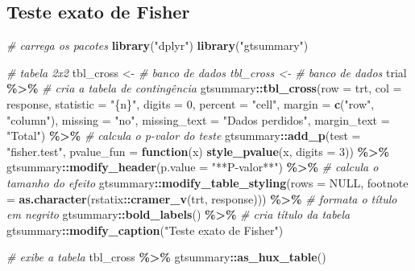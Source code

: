 \documentclass[
]{book}
\newenvironment{Shaded}{\begin{snugshade}}{\end{snugshade}}
\newcommand{\AttributeTok}[1]{\textcolor[rgb]{0.13,0.29,0.53}{#1}}
\newcommand{\CommentTok}[1]{\textcolor[rgb]{0.56,0.35,0.01}{\textit{#1}}}
\newcommand{\ConstantTok}[1]{\textcolor[rgb]{0.56,0.35,0.01}{#1}}
\newcommand{\ControlFlowTok}[1]{\textcolor[rgb]{0.13,0.29,0.53}{\textbf{#1}}}
\newcommand{\DecValTok}[1]{\textcolor[rgb]{0.00,0.00,0.81}{#1}}
\newcommand{\FunctionTok}[1]{\textcolor[rgb]{0.13,0.29,0.53}{\textbf{#1}}}
\newcommand{\NormalTok}[1]{#1}
\newcommand{\OtherTok}[1]{\textcolor[rgb]{0.56,0.35,0.01}{#1}}
\newcommand{\SpecialCharTok}[1]{\textcolor[rgb]{0.81,0.36,0.00}{\textbf{#1}}}
\newcommand{\StringTok}[1]{\textcolor[rgb]{0.31,0.60,0.02}{#1}}
\begin{document}
\hypertarget{teste-exato-de-fisher}{%
\subsection{Teste exato de Fisher}\label{teste-exato-de-fisher}}

\begin{Shaded}
\begin{Highlighting}[]
\CommentTok{\# carrega os pacotes}
\FunctionTok{library}\NormalTok{(}\StringTok{"dplyr"}\NormalTok{)}
\FunctionTok{library}\NormalTok{(}\StringTok{"gtsummary"}\NormalTok{)}

\CommentTok{\# tabela 2x2}
\NormalTok{tbl\_cross }\OtherTok{\textless{}{-}} \CommentTok{\# banco de dados tbl\_cross \textless{}{-} \# banco de dados}
\NormalTok{trial }\SpecialCharTok{\%\textgreater{}\%}
    \CommentTok{\# cria a tabela de contingência}
\NormalTok{gtsummary}\SpecialCharTok{::}\FunctionTok{tbl\_cross}\NormalTok{(}\AttributeTok{row =}\NormalTok{ trt, }\AttributeTok{col =}\NormalTok{ response, }\AttributeTok{statistic =} \StringTok{"\{n\}"}\NormalTok{, }\AttributeTok{digits =} \DecValTok{0}\NormalTok{, }\AttributeTok{percent =} \StringTok{"cell"}\NormalTok{,}
    \AttributeTok{margin =} \FunctionTok{c}\NormalTok{(}\StringTok{"row"}\NormalTok{, }\StringTok{"column"}\NormalTok{), }\AttributeTok{missing =} \StringTok{"no"}\NormalTok{, }\AttributeTok{missing\_text =} \StringTok{"Dados perdidos"}\NormalTok{,}
    \AttributeTok{margin\_text =} \StringTok{"Total"}\NormalTok{) }\SpecialCharTok{\%\textgreater{}\%}
    \CommentTok{\# calcula o p{-}valor do teste}
\NormalTok{gtsummary}\SpecialCharTok{::}\FunctionTok{add\_p}\NormalTok{(}\AttributeTok{test =} \StringTok{"fisher.test"}\NormalTok{, }\AttributeTok{pvalue\_fun =} \ControlFlowTok{function}\NormalTok{(x) }\FunctionTok{style\_pvalue}\NormalTok{(x, }\AttributeTok{digits =} \DecValTok{3}\NormalTok{)) }\SpecialCharTok{\%\textgreater{}\%}
\NormalTok{    gtsummary}\SpecialCharTok{::}\FunctionTok{modify\_header}\NormalTok{(}\AttributeTok{p.value =} \StringTok{"**P{-}valor**"}\NormalTok{) }\SpecialCharTok{\%\textgreater{}\%}
    \CommentTok{\# calcula o tamanho do efeito}
\NormalTok{gtsummary}\SpecialCharTok{::}\FunctionTok{modify\_table\_styling}\NormalTok{(}\AttributeTok{rows =} \ConstantTok{NULL}\NormalTok{, }\AttributeTok{footnote =} \FunctionTok{as.character}\NormalTok{(rstatix}\SpecialCharTok{::}\FunctionTok{cramer\_v}\NormalTok{(trt,}
\NormalTok{    response))) }\SpecialCharTok{\%\textgreater{}\%}
    \CommentTok{\# formata o título em negrito}
\NormalTok{gtsummary}\SpecialCharTok{::}\FunctionTok{bold\_labels}\NormalTok{() }\SpecialCharTok{\%\textgreater{}\%}
    \CommentTok{\# cria título da tabela}
\NormalTok{gtsummary}\SpecialCharTok{::}\FunctionTok{modify\_caption}\NormalTok{(}\StringTok{"Teste exato de Fisher"}\NormalTok{)}

\CommentTok{\# exibe a tabela}
\NormalTok{tbl\_cross }\SpecialCharTok{\%\textgreater{}\%}
\NormalTok{    gtsummary}\SpecialCharTok{::}\FunctionTok{as\_hux\_table}\NormalTok{()}
\end{Highlighting}
\end{Shaded}
\end{document}

